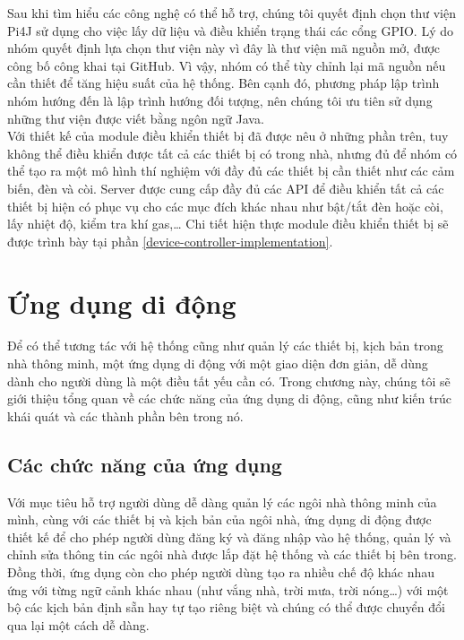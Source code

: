 \documentclass[12pt,a4paper,oneside]{extbook}
\begin{document}
\noindent
Sau khi tìm hiểu các công nghệ có thể hỗ trợ, chúng tôi quyết định chọn thư viện Pi4J sử dụng cho việc lấy dữ liệu và điều khiển trạng thái các cổng GPIO. Lý do nhóm quyết định lựa chọn thư viện này vì đây là thư viện mã nguồn mở, được công bố công khai tại GitHub. Vì vậy, nhóm có thể tùy chỉnh lại mã nguồn nếu cần thiết để tăng hiệu suất của hệ thống. Bên cạnh đó, phương pháp lập trình nhóm hướng đến là lập trình hướng đối tượng, nên chúng tôi ưu tiên sử dụng những thư viện được viết bằng ngôn ngữ Java.\\

\noindent
Với thiết kế của module điều khiển thiết bị đã được nêu ở những phần trên, tuy không thể điều khiển được tất cả các thiết bị có trong nhà, nhưng đủ để nhóm có thể tạo ra một mô hình thí nghiệm với đầy đủ các thiết bị cần thiết như các cảm biến, đèn và còi. Server được cung cấp đầy đủ các API để điều khiển tất cả các thiết bị hiện có phục vụ cho các mục đích khác nhau như bật/tắt đèn hoặc còi, lấy nhiệt độ, kiểm tra khí gas,\dots\hspace{0mm} Chi tiết hiện thực module điều khiển thiết bị sẽ được trình bày tại phần \ref{device-controller-implementation}.


\chapter{Ứng dụng di động}

Để có thể tương tác với hệ thống cũng như quản lý các thiết bị, kịch bản trong nhà thông minh, một ứng dụng di động với một giao diện đơn giản, dễ dùng dành cho người dùng là một điều tất yếu cần có. Trong chương này, chúng tôi sẽ giới thiệu tổng quan về các chức năng của ứng dụng di động, cũng như kiến trúc khái quát và các thành phần bên trong nó.


\section{Các chức năng của ứng dụng}

Với mục tiêu hỗ trợ người dùng dễ dàng quản lý các ngôi nhà thông minh của mình, cùng với các thiết bị và kịch bản của ngôi nhà, ứng dụng di động được thiết kế để cho phép người dùng đăng ký và đăng nhập vào hệ thống, quản lý và chỉnh sửa thông tin các ngôi nhà được lắp đặt hệ thống và các thiết bị bên trong. Đồng thời, ứng dụng còn cho phép người dùng tạo ra nhiều chế độ khác nhau ứng với từng ngữ cảnh khác nhau (như vắng nhà, trời mưa, trời nóng…) với một bộ các kịch bản định sẵn hay tự tạo riêng biệt và chúng có thể được chuyển đổi qua lại một cách dễ dàng.
\end{document}
